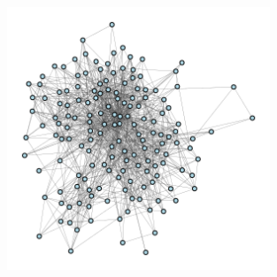 \documentclass[12pt]{article}
\begin{document}
\begin{appendix}
\begin{figure}
\end{figure}
\begin{figure}
  \centering
  \caption{\protect}
  \includegraphics[width=0.7\textwidth]{../3_results/town_15.png} \\
\end{figure}


\end{appendix}
\end{document}
